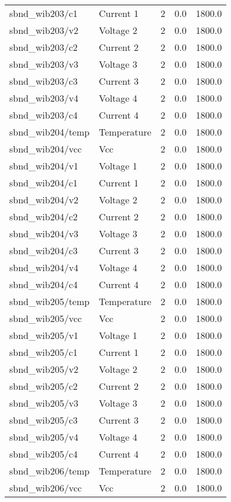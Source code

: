 \begin{center}
\begin{longtable}{l | l l l l }
sbnd\_wib203/c1 & Current 1 & 2 & 0.0 & 1800.0\\ 
sbnd\_wib203/v2 & Voltage 2 & 2 & 0.0 & 1800.0\\ 
sbnd\_wib203/c2 & Current 2 & 2 & 0.0 & 1800.0\\ 
sbnd\_wib203/v3 & Voltage 3 & 2 & 0.0 & 1800.0\\ 
sbnd\_wib203/c3 & Current 3 & 2 & 0.0 & 1800.0\\ 
sbnd\_wib203/v4 & Voltage 4 & 2 & 0.0 & 1800.0\\ 
sbnd\_wib203/c4 & Current 4 & 2 & 0.0 & 1800.0\\ 
sbnd\_wib204/temp & Temperature & 2 & 0.0 & 1800.0\\ 
sbnd\_wib204/vcc & Vcc & 2 & 0.0 & 1800.0\\ 
sbnd\_wib204/v1 & Voltage 1 & 2 & 0.0 & 1800.0\\ 
sbnd\_wib204/c1 & Current 1 & 2 & 0.0 & 1800.0\\ 
sbnd\_wib204/v2 & Voltage 2 & 2 & 0.0 & 1800.0\\ 
sbnd\_wib204/c2 & Current 2 & 2 & 0.0 & 1800.0\\ 
sbnd\_wib204/v3 & Voltage 3 & 2 & 0.0 & 1800.0\\ 
sbnd\_wib204/c3 & Current 3 & 2 & 0.0 & 1800.0\\ 
sbnd\_wib204/v4 & Voltage 4 & 2 & 0.0 & 1800.0\\ 
sbnd\_wib204/c4 & Current 4 & 2 & 0.0 & 1800.0\\ 
sbnd\_wib205/temp & Temperature & 2 & 0.0 & 1800.0\\ 
sbnd\_wib205/vcc & Vcc & 2 & 0.0 & 1800.0\\ 
sbnd\_wib205/v1 & Voltage 1 & 2 & 0.0 & 1800.0\\ 
sbnd\_wib205/c1 & Current 1 & 2 & 0.0 & 1800.0\\ 
sbnd\_wib205/v2 & Voltage 2 & 2 & 0.0 & 1800.0\\ 
sbnd\_wib205/c2 & Current 2 & 2 & 0.0 & 1800.0\\ 
sbnd\_wib205/v3 & Voltage 3 & 2 & 0.0 & 1800.0\\ 
sbnd\_wib205/c3 & Current 3 & 2 & 0.0 & 1800.0\\ 
sbnd\_wib205/v4 & Voltage 4 & 2 & 0.0 & 1800.0\\ 
sbnd\_wib205/c4 & Current 4 & 2 & 0.0 & 1800.0\\ 
sbnd\_wib206/temp & Temperature & 2 & 0.0 & 1800.0\\ 
sbnd\_wib206/vcc & Vcc & 2 & 0.0 & 1800.0\\ 

\end{longtable}
\end{center}
